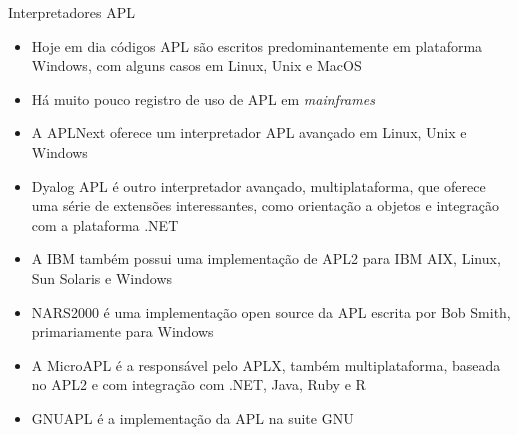 \begin{frame}[fragile]{Interpretadores APL}

    \begin{itemize}
        \item Hoje em dia códigos APL são escritos predominantemente em plataforma Windows, com alguns casos em Linux, Unix e MacOS
        \pause

        \item Há muito pouco registro de uso de APL em \textit{mainframes}
        \pause

        \item A APLNext oferece um interpretador APL avançado em Linux, Unix e Windows
        \pause

        \item Dyalog APL é outro interpretador avançado, multiplataforma, que oferece uma série de extensões interessantes, como orientação a objetos e integração com a plataforma .NET
        \pause

        \item A IBM também possui uma implementação de APL2 para IBM AIX, Linux, Sun Solaris e Windows
        \pause

        \item NARS2000 é uma implementação open source da APL escrita por Bob Smith, primariamente para Windows
        \pause

        \item A MicroAPL é a responsável pelo APLX, também multiplataforma, baseada no APL2 e com integração com .NET, Java, Ruby e R
        \pause

        \item GNUAPL é a implementação da APL na suite GNU
    \end{itemize}

\end{frame}

